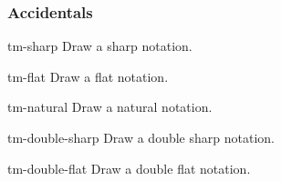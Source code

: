 \subsubsection{Accidentals}\label{sec:out:pic:accidentals}
\begin{pictype}{tm-sharp}{}
  Draw a sharp notation.
\end{pictype}
\begin{pictype}{tm-flat}{}
  Draw a flat notation.
\end{pictype}
\begin{pictype}{tm-natural}{}
  Draw a natural notation.
\end{pictype}
\begin{pictype}{tm-double-sharp}{}
  Draw a double sharp notation.
\end{pictype}
\begin{pictype}{tm-double-flat}{}
  Draw a double flat notation.
\end{pictype}
\begin{codeexample}[]
\end{codeexample}
